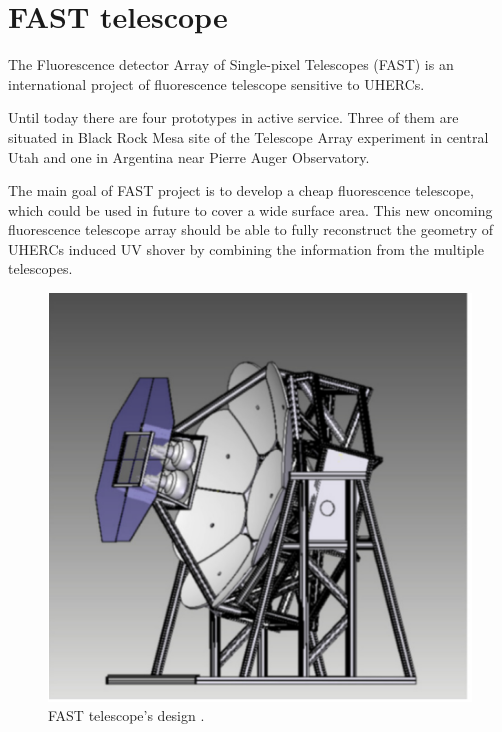 
\chapter{FAST telescope}
The  Fluorescence  detector  Array  of  Single-pixel  Telescopes  (FAST) is an international project of fluorescence telescope sensitive to UHERCs. 
\par
Until today there are four prototypes in active service. Three of them are situated in Black Rock Mesa site of the Telescope Array experiment in central Utah and one in Argentina near Pierre Auger Observatory.
\par
The main goal of FAST project is to develop a cheap fluorescence telescope, which could be used in future to cover a wide surface area. This new oncoming fluorescence telescope array should be able  
to fully reconstruct the geometry of UHERCs induced UV shover by combining the information from the multiple telescopes.

\begin{figure}[H]
 \centering
 \includegraphics[scale = 0.5]{./pictures/fastTheoretical}
 \caption{FAST telescope's design \cite{MALACARI2020102430}.}
 \label{FASThut}
 
\end{figure}


